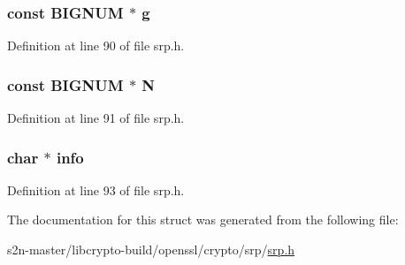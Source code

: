 \subsubsection[{\texorpdfstring{g}{g}}]{\setlength{\rightskip}{0pt plus 5cm}const {\bf B\+I\+G\+N\+UM} $\ast$ g}\hypertarget{struct_s_r_p__user__pwd__st_a74911ab79e6547667d292a313b160902}{}\label{struct_s_r_p__user__pwd__st_a74911ab79e6547667d292a313b160902}


Definition at line 90 of file srp.\+h.

\subsubsection[{\texorpdfstring{N}{N}}]{\setlength{\rightskip}{0pt plus 5cm}const {\bf B\+I\+G\+N\+UM} $\ast$ N}\hypertarget{struct_s_r_p__user__pwd__st_a7ffec2b8f3e6b6c546f4eebc6cae727c}{}\label{struct_s_r_p__user__pwd__st_a7ffec2b8f3e6b6c546f4eebc6cae727c}


Definition at line 91 of file srp.\+h.

\subsubsection[{\texorpdfstring{info}{info}}]{\setlength{\rightskip}{0pt plus 5cm}char $\ast$ info}\hypertarget{struct_s_r_p__user__pwd__st_abd59b785f164cf0a2612687a73c5e81d}{}\label{struct_s_r_p__user__pwd__st_abd59b785f164cf0a2612687a73c5e81d}


Definition at line 93 of file srp.\+h.



The documentation for this struct was generated from the following file\+:\begin{DoxyCompactItemize}
\item 
s2n-\/master/libcrypto-\/build/openssl/crypto/srp/\hyperlink{crypto_2srp_2srp_8h}{srp.\+h}\end{DoxyCompactItemize}
